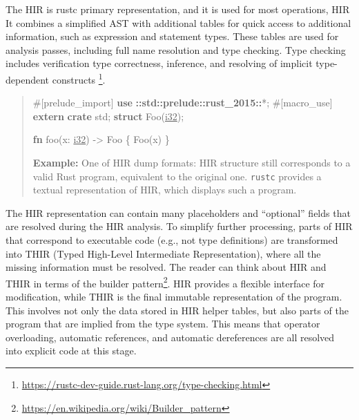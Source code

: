 \documentclass[
  11pt,
  twoside,symmetric]{report}
\newenvironment{Shaded}{}{}
\newcommand{\AttributeTok}[1]{#1}
\newcommand{\DataTypeTok}[1]{\underline{#1}}
\newcommand{\KeywordTok}[1]{\textbf{#1}}
\newcommand{\NormalTok}[1]{#1}
\newcommand{\OperatorTok}[1]{#1}
\newcommand{\PreprocessorTok}[1]{\textbf{#1}}
\DeclareRobustCommand{\href}[2]{#2\footnote{\url{#1}}}
\begin{document}
The HIR is rustc primary representation, and it is used for most
operations, HIR It combines a
simplified AST with additional tables for quick access to additional
information, such as expression and statement types. These tables are
used for analysis passes, including full name resolution and type
checking. Type checking includes verification type correctness,
inference, and resolving of implicit type-dependent
constructs \footnote{\url{https://rustc-dev-guide.rust-lang.org/type-checking.html}}.

\begin{quote}
\begin{Shaded}
\begin{Highlighting}[]
 \AttributeTok{\#[}\NormalTok{prelude\_import}\AttributeTok{]}
 \KeywordTok{use} \PreprocessorTok{::std::prelude::rust\_2015::}\OperatorTok{*;}
 \AttributeTok{\#[}\NormalTok{macro\_use}\AttributeTok{]}
 \KeywordTok{extern} \KeywordTok{crate}\NormalTok{ std}\OperatorTok{;}
 \KeywordTok{struct}\NormalTok{ Foo(}\DataTypeTok{i32}\NormalTok{)}\OperatorTok{;}

 \KeywordTok{fn}\NormalTok{ foo(x}\OperatorTok{:} \DataTypeTok{i32}\NormalTok{) }\OperatorTok{{-}\textgreater{}}\NormalTok{ Foo }\OperatorTok{\{}\NormalTok{ Foo(x) }\OperatorTok{\}}
\end{Highlighting}
\end{Shaded}

\textbf{Example:} One of HIR dump formats: HIR structure still
corresponds to a valid Rust program, equivalent to the original one.
\texttt{rustc} provides a textual representation of HIR, which displays
such a program.
\end{quote}

The HIR representation can contain many placeholders and ``optional''
fields that are resolved during the HIR analysis. To simplify further
processing, parts of HIR that correspond to executable code (e.g., not
type definitions) are transformed into THIR (Typed High-Level
Intermediate Representation), where all the missing information must be
resolved. The reader can think about HIR and THIR in terms of the
\href{https://en.wikipedia.org/wiki/Builder_pattern}{builder pattern}.
HIR provides a flexible interface for modification, while THIR is the
final immutable representation of the program. This involves not only
the data stored in HIR helper tables, but also parts of the program that
are implied from the type system. This means that operator overloading,
automatic references, and automatic dereferences are all resolved into
explicit code at this stage.
\end{document}
